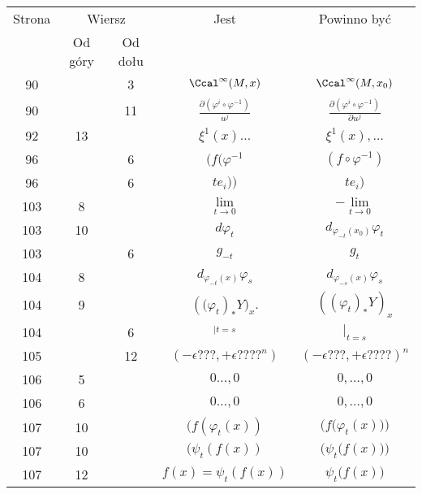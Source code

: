 \documentclass[a4paper,11pt]{article}
\numberwithin{equation}{section}
\begin{document}
\begin{center}
  \begin{tabular}{|c|c|c|c|c|}
    \hline
    Strona & \multicolumn{2}{c|}{Wiersz} & Jest
                              & Powinno być \\ \cline{2-3}
    & Od góry & Od dołu & & \\
    \hline
    \hphantom{0}90 & & \hphantom{0}3 & $\Ccal^{ \infty }( M, x )$
    & $\Ccal^{ \infty }( M, x_{ 0 } )$ \\
    \hphantom{0}90 & & 11 & $\frac{ \partial ( \varphi^{ i } \circ \varphi^{ -1 } ) }{ u^{ j } }$
           & $\frac{ \partial ( \varphi^{ i } \circ \varphi^{ -1 } ) }{ \partial u^{ j } }$ \\
    \hphantom{0}92 & 13 & & $\xi^{ 1 }( x ) \ldots$ & $\xi^{ 1 }( x ), \ldots$ \\
    \hphantom{0}96 & & \hphantom{0}6 & $( f ( \varphi^{ -1 }$
    & $( f \circ \varphi^{ -1 } )$ \\
    \hphantom{0}96 & & \hphantom{0}6 & $t e_{ i } ))$ & $t e_{ i } )$ \\
    103 & \hphantom{0}8 & & $\lim\limits_{ t \to 0 }$
           & $-\lim\limits_{ t \to 0 }$ \\
    103 & 10 & & $d \varphi_{ t }$ & $d_{ \varphi_{ -t }( x_{ 0 } ) } \varphi_{ t }$ \\
    103 & & \hphantom{0}6 & $g_{ -t }$ & $g_{ t }$ \\
    104 & \hphantom{0}8 & & $d_{ \varphi_{ -t }( x ) } \varphi_{ s }$
           & $d_{ \varphi_{ -s }( x ) } \varphi_{ s }$ \\
    104 & \hphantom{0}9 & & $( \big( \varphi_{ t } )_{*} Y \big)_{ x }$.
           & $( ( \varphi_{ t } )_{ * } Y )_{ x }$ \\
    104 & & \hphantom{0}6 & $_{ | t = s }$ & $|_{ t = s }$ \\
    105 & & 12 & $( - \epsilon???, + \epsilon????^{ n } )$ & $( -\epsilon???, +\epsilon???? )^{ n }$ \\
    106 & \hphantom{0}5 & & $0\ldots, 0$ & $0, \ldots, 0$ \\
    106 & \hphantom{0}6 & & $0\ldots, 0$ & $0, \ldots, 0$ \\
    107 & 10 & & $( f( \varphi_{ t }( x ) )$
    & $\Big( f\big( \varphi_{ t }( x ) \big) \Big)$ \\
    107 & 10 & & $( \psi_{ t } ( f( x ) )$
    & $\Big( \psi_{ t }\big( f( x ) \big) \Big)$ \\
    107 & 12 & & $f( x ) = \psi_{ t }( f( x ) )$
           & $\psi_{ t }\big( f( x ) \big)$ \\

\end{tabular}
\end{center}
\end{document}
